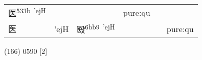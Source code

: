 \documentclass[14pt,a4paper]{scrartcl}
\begin{document}
\begin{longtable}[c]{@{}llllll@{}}
\begin{minipage}[t]{0.14\columnwidth}\raggedright\strut
医\textsuperscript{533b~'ejH}
\strut\end{minipage} &
\begin{minipage}[t]{0.14\columnwidth}\raggedright\strut
\strut\end{minipage} &
\begin{minipage}[t]{0.14\columnwidth}\raggedright\strut
\strut\end{minipage} &
\begin{minipage}[t]{0.14\columnwidth}\raggedright\strut
pure:qu
\strut\end{minipage}\tabularnewline
\begin{minipage}[t]{0.14\columnwidth}\raggedright\strut
医
\strut\end{minipage} &
\begin{minipage}[t]{0.14\columnwidth}\raggedright\strut
'ejH
\strut\end{minipage} &
\begin{minipage}[t]{0.14\columnwidth}\raggedright\strut
殹\textsuperscript{6bb9~'ejH}
\strut\end{minipage} &
\begin{minipage}[t]{0.14\columnwidth}\raggedright\strut
\strut\end{minipage} &
\begin{minipage}[t]{0.14\columnwidth}\raggedright\strut
\strut\end{minipage} &
\begin{minipage}[t]{0.14\columnwidth}\raggedright\strut
pure:qu
\strut\end{minipage}\tabularnewline
\bottomrule
\end{longtable}

(166) 0590 {[}2{]}
\end{document}
